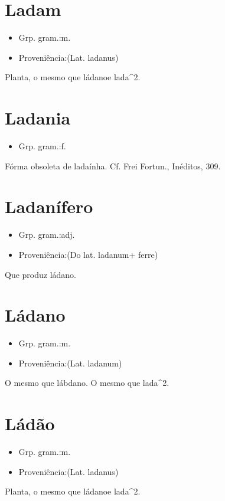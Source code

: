 \section{Ladam}
\begin{itemize}
\item {Grp. gram.:m.}
\end{itemize}
\begin{itemize}
\item {Proveniência:(Lat. \textunderscore ladanus\textunderscore )}
\end{itemize}
Planta, o mesmo que \textunderscore ládano\textunderscore  e \textunderscore lada\textunderscore ^2.
\section{Ladania}
\begin{itemize}
\item {Grp. gram.:f.}
\end{itemize}
Fórma obsoleta de ladaínha. Cf. Frei Fortun., \textunderscore Inéditos\textunderscore , 309.
\section{Ladanífero}
\begin{itemize}
\item {Grp. gram.:adj.}
\end{itemize}
\begin{itemize}
\item {Proveniência:(Do lat. \textunderscore ladanum\textunderscore  + \textunderscore ferre\textunderscore )}
\end{itemize}
Que produz ládano.
\section{Ládano}
\begin{itemize}
\item {Grp. gram.:m.}
\end{itemize}
\begin{itemize}
\item {Proveniência:(Lat. \textunderscore ladanum\textunderscore )}
\end{itemize}
O mesmo que \textunderscore lábdano\textunderscore .
O mesmo que \textunderscore lada\textunderscore ^2.
\section{Ládão}
\begin{itemize}
\item {Grp. gram.:m.}
\end{itemize}
\begin{itemize}
\item {Proveniência:(Lat. \textunderscore ladanus\textunderscore )}
\end{itemize}
Planta, o mesmo que \textunderscore ládano\textunderscore  e \textunderscore lada\textunderscore ^2.
